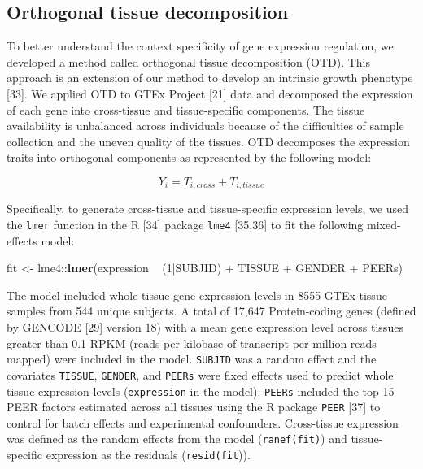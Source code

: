 \documentclass[]{article}
\newenvironment{Shaded}{\begin{snugshade}}{\end{snugshade}}
\newcommand{\KeywordTok}[1]{\textcolor[rgb]{0.13,0.29,0.53}{\textbf{{#1}}}}
\newcommand{\DecValTok}[1]{\textcolor[rgb]{0.00,0.00,0.81}{{#1}}}
\newcommand{\StringTok}[1]{\textcolor[rgb]{0.31,0.60,0.02}{{#1}}}
\newcommand{\NormalTok}[1]{{#1}}
\begin{document}
\subsection{Orthogonal tissue
decomposition}\label{orthogonal-tissue-decomposition}

To better understand the context specificity of gene expression
regulation, we developed a method called orthogonal tissue decomposition
(OTD). This approach is an extension of our method to develop an
intrinsic growth phenotype {[}33{]}. We applied OTD to GTEx Project
{[}21{]} data and decomposed the expression of each gene into
cross-tissue and tissue-specific components. The tissue availability is
unbalanced across individuals because of the difficulties of sample
collection and the uneven quality of the tissues. OTD decomposes the
expression traits into orthogonal components as represented by the
following model:

\[ Y_i = T_{i,cross} + T_{i,tissue} \]

Specifically, to generate cross-tissue and tissue-specific expression
levels, we used the \texttt{lmer} function in the R {[}34{]} package
\texttt{lme4} {[}35,36{]} to fit the following mixed-effects model:

\begin{Shaded}
\begin{Highlighting}[]
\NormalTok{fit <-}\StringTok{ }\NormalTok{lme4::}\KeywordTok{lmer}\NormalTok{(expression ~}\StringTok{ }\NormalTok{(}\DecValTok{1}\NormalTok{|SUBJID) +}\StringTok{ }\NormalTok{TISSUE +}\StringTok{ }\NormalTok{GENDER +}\StringTok{ }\NormalTok{PEERs)}
\end{Highlighting}
\end{Shaded}

The model included whole tissue gene expression levels in 8555 GTEx
tissue samples from 544 unique subjects. A total of 17,647
Protein-coding genes (defined by GENCODE {[}29{]} version 18) with a
mean gene expression level across tissues greater than 0.1 RPKM (reads
per kilobase of transcript per million reads mapped) were included in
the model. \texttt{SUBJID} was a random effect and the covariates
\texttt{TISSUE}, \texttt{GENDER}, and \texttt{PEERs} were fixed effects
used to predict whole tissue expression levels (\texttt{expression} in
the model). \texttt{PEERs} included the top 15 PEER factors estimated
across all tissues using the R package \texttt{PEER} {[}37{]} to control
for batch effects and experimental confounders. Cross-tissue expression
was defined as the random effects from the model (\texttt{ranef(fit)})
and tissue-specific expression as the residuals (\texttt{resid(fit})).
\end{document}
